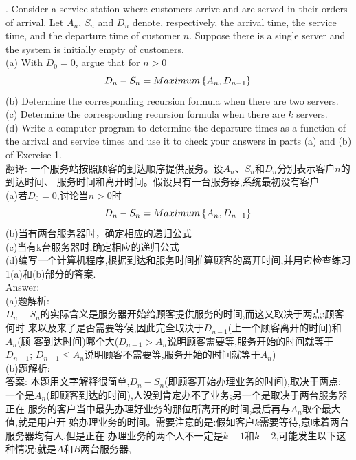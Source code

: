\documentclass{book}
\begin{document}
. Consider a service station where customers arrive and are served in their orders
of arrival. Let $A_{n}$, $S_{n}$ and $D_{n}$ denote, respectively, the arrival time,
the service time, and the departure time of customer $n$. Suppose there is a single
server and the system is initially empty of customers. \\
\indent
(a) With $D_{0} = 0$, argue that for $n > 0$
$$
    D_{n} - S_{n} = Maximum\left\{A_{n}, D_{n-1}\right\} \\
$$
\indent
(b) Determine the corresponding recursion formula when there are two servers. \\
\indent
(c) Determine the corresponding recursion formula when there are $k$ servers. \\
\indent
(d) Write a computer program to determine the departure times as a function of the arrival and
service times and use it to check your answers in parts (a) and (b) of Exercise 1. \\
\noindent
翻译:
一个服务站按照顾客的到达顺序提供服务。设$A_{n}$、$S_{n}$和$D_{n}$分别表示客户$n$的到达时间、
服务时间和离开时间。假设只有一台服务器,系统最初没有客户 \\
\indent
(a)若$D_{0} = 0$,讨论当$n > 0$时
$$
    D_{n} - S_{n} = Maximum\left\{A_{n}, D_{n-1}\right\} \\
$$
\indent
(b)当有两台服务器时，确定相应的递归公式 \\
\indent
(c)当有k台服务器时,确定相应的递归公式 \\
\indent
(d)编写一个计算机程序,根据到达和服务时间推算顾客的离开时间,并用它检查练习1(a)和(b)部分的答案. \\
\noindent
Answer: \\
(a)题解析: \\
$D_{n}-S_{n}$的实际含义是服务器开始给顾客提供服务的时间,而这又取决于两点:顾客何时
来以及来了是否需要等侯,因此完全取决于$D_{n-1}$(上一个顾客离开的时间)和$A_{n}$(顾
客到达时间)哪个大($D_{n-1} > A_{n}$说明顾客需要等,服务开始的时间就等于$D_{n-1}$;
$D_{n-1} \leq A_{n}$说明顾客不需要等,服务开始的时间就等于$A_{n}$) \\
(b)题解析: \\
答案: 本题用文字解释很简单,$D_{n} - S_{n}$(即顾客开始办理业务的时间),取决于两点:
一个是$A_{n}$(即顾客到达的时间),人没到肯定办不了业务;另一个是取决于两台服务器正在
服务的客户当中最先办理好业务的那位所离开的时间,最后再与$A_{n}$取个最大值,就是用户开
始办理业务的时间。需要注意的是:假如客户$k$需要等待,意味着两台服务器均有人,但是正在
办理业务的两个人不一定是$k-1$和$k-2$,可能发生以下这种情况:就是$A$和$B$两台服务器,
\end{document}
